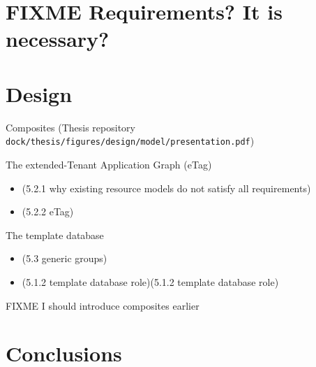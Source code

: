 \section{FIXME Requirements? It is necessary?}

\section{Design}
\begin{frame}{Composites}
  (Thesis repository \texttt{dock/thesis/figures/design/model/presentation.pdf})
\end{frame}
\begin{frame}{The extended-Tenant Application Graph (eTag)}
  \begin{itemize}
    \item (5.2.1 why existing resource models do not satisfy all requirements)
    \item (5.2.2 eTag)
  \end{itemize}
\end{frame}
\begin{frame}{The template database}
  \begin{itemize}
    \item (5.3 generic groups)
    \item (5.1.2 template database role)(5.1.2 template database role)
  \end{itemize}
\end{frame}
\begin{frame}{FIXME I should introduce composites earlier}
\end{frame}

\section{Conclusions}






